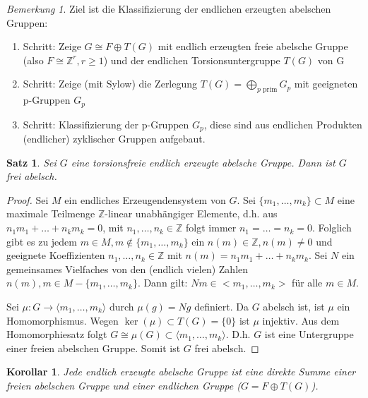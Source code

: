 \documentclass[12pt]{scrartcl} %
\newtheorem{thm}{Satz}
\newtheorem{kor}{Korollar}
\theoremstyle{definition}
\theoremstyle{remark}
\newtheorem*{nb}{Bemerkung}
\begin{document}

\begin{nb}
Ziel ist die Klassifizierung der endlichen erzeugten abelschen Gruppen:
\begin{enumerate}
\item Schritt: Zeige $G \cong F \oplus T(G)$ mit endlich erzeugten freie abelsche Gruppe (also $F \cong \mathbb{Z}^{r}, r \geq 1$) und der endlichen Torsionsuntergruppe $T(G)$ von G
\item Schritt: Zeige (mit Sylow) die Zerlegung $T(G) = \bigoplus_{p\text{ prim}} G_{p}$ mit geeigneten p-Gruppen $G_{p}$
\item Schritt: Klassifizierung der p-Gruppen $G_{p}$, diese sind aus endlichen Produkten (endlicher) zyklischer Gruppen aufgebaut.
\end{enumerate}
\end{nb}

\begin{thm}
Sei $G$ eine torsionsfreie endlich erzeugte abelsche Gruppe. Dann ist $G$ frei abelsch.
\end{thm}

\begin{proof}
Sei $M$ ein endliches Erzeugendensystem von $G$. 
Sei $\{m_{1}, \dots ,m_{k}\} \subset M$ eine maximale Teilmenge $\mathbb{Z}$-linear unabhängiger Elemente, d.h. aus $n_{1}m_{1}+ \dots +n_{k}m_{k}=0$, mit $n_{1}, \dots ,n_{k} \in \mathbb{Z}$ folgt immer $n_{1}= \dots =n_{k}=0$. 
Folglich gibt es zu jedem $m \in M, m \notin \{m_{1}, \dots ,m_{k}\}$ ein $n(m) \in \mathbb{Z}, n(m)\neq 0$ und geeignete Koeffizienten $n_{1}, \dots ,n_{k} \in \mathbb{Z}$ mit $n(m)=n_{1}m_{1}+ \dots +n_{k}m_{k}$. 
Sei $N$ ein gemeinsames Vielfaches von den (endlich vielen) Zahlen $n(m),m \in M-\{m_{1}, \dots ,m_{k}\}$. 
Dann gilt: $Nm \in <m_{1}, \dots ,m_{k}>$ für alle $m \in M$.

Sei $\mu :G\rightarrow \langle m_{1}, \dots ,m_{k} \rangle $ durch $\mu (g)=Ng$ definiert. Da $G$ abelsch ist, ist $\mu$ ein Homomorphismus. Wegen $\ker(\mu ) \subset T(G) = \{ 0\}$ ist $\mu$ injektiv. Aus dem Homomorphiesatz folgt $G \cong \mu (G) \subset \langle m_{1}, \dots ,m_{k}\rangle$. D.h. $G$ ist eine Untergruppe einer freien abelschen Gruppe. Somit ist $G$ frei abelsch.
\end{proof}

\begin{kor}
Jede endlich erzeugte abelsche Gruppe ist eine direkte Summe einer freien abelschen Gruppe und einer endlichen Gruppe ($G=F\oplus T(G)$).
\end{kor}
\end{document}
